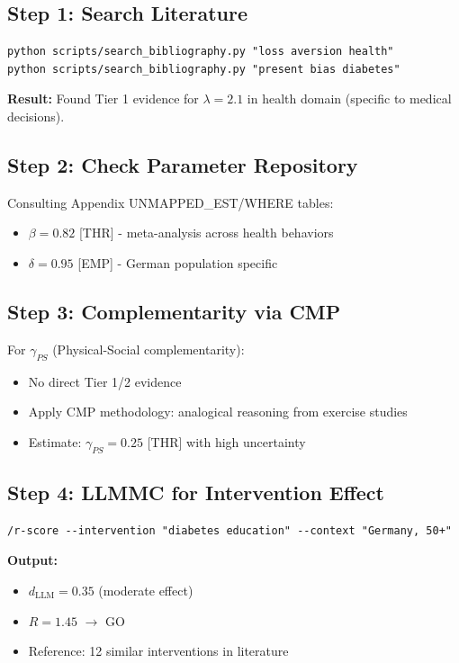 \subsection{Step 1: Search Literature}

\begin{verbatim}
python scripts/search_bibliography.py "loss aversion health"
python scripts/search_bibliography.py "present bias diabetes"
\end{verbatim}

\textbf{Result:} Found Tier 1 evidence for $\lambda = 2.1$ in health domain (specific to medical decisions).

\subsection{Step 2: Check Parameter Repository}

Consulting Appendix UNMAPPED_EST/WHERE tables:
\begin{itemize}[nosep]
    \item $\beta = 0.82$ [THR] - meta-analysis across health behaviors
    \item $\delta = 0.95$ [EMP] - German population specific
\end{itemize}

\subsection{Step 3: Complementarity via CMP}

For $\gamma_{PS}$ (Physical-Social complementarity):
\begin{itemize}[nosep]
    \item No direct Tier 1/2 evidence
    \item Apply CMP methodology: analogical reasoning from exercise studies
    \item Estimate: $\gamma_{PS} = 0.25$ [THR] with high uncertainty
\end{itemize}

\subsection{Step 4: LLMMC for Intervention Effect}

\begin{verbatim}
/r-score --intervention "diabetes education" --context "Germany, 50+"
\end{verbatim}

\textbf{Output:}
\begin{itemize}[nosep]
    \item $d_{\text{LLM}} = 0.35$ (moderate effect)
    \item $R = 1.45$ $\rightarrow$ GO
    \item Reference: 12 similar interventions in literature
\end{itemize}

